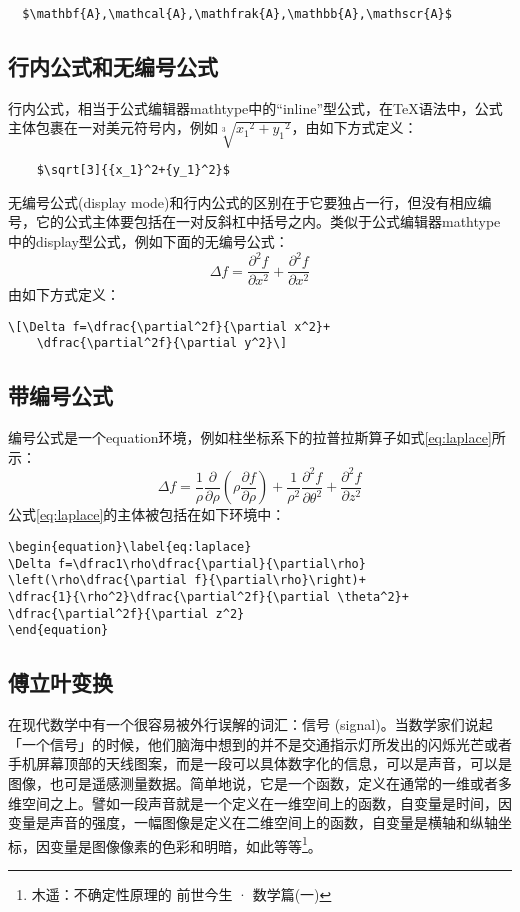 \begin{lstlisting}
  $\mathbf{A},\mathcal{A},\mathfrak{A},\mathbb{A},\mathscr{A}$
\end{lstlisting}

\subsection{行内公式和无编号公式}
行内公式，相当于公式编辑器mathtype中的“inline”型公式，在\TeX{}语法中，公式主体包裹在一对美元符号内，例如$\sqrt[3]{{x_1}^2+{y_1}^2}$，由如下方式定义：
\begin{lstlisting}
	$\sqrt[3]{{x_1}^2+{y_1}^2}$
\end{lstlisting}
无编号公式(display mode)和行内公式的区别在于它要独占一行，但没有相应编号，它的公式主体要包括在一对反斜杠中括号之内。类似于公式编辑器mathtype中的display型公式，例如下面的无编号公式：\[\Delta f=\dfrac{\partial^2f}{\partial x^2}+\dfrac{\partial^2f}{\partial x^2}\]由如下方式定义：
\begin{lstlisting}
\[\Delta f=\dfrac{\partial^2f}{\partial x^2}+
	\dfrac{\partial^2f}{\partial y^2}\]
\end{lstlisting}
\subsection{带编号公式}
编号公式是一个equation环境，例如柱坐标系下的拉普拉斯算子如式\ref{eq:laplace}所示：
\begin{equation}\label{eq:laplace}
	\Delta f=\dfrac1\rho\dfrac{\partial}{\partial \rho}\left(\rho\dfrac{\partial f}{\partial\rho}\right)+
	\dfrac{1}{\rho^2}\dfrac{\partial^2f}{\partial \theta^2}+
	\dfrac{\partial^2f}{\partial z^2}
\end{equation}
公式\ref{eq:laplace}的主体被包括在如下环境中：
\begin{lstlisting}
\begin{equation}\label{eq:laplace}
\Delta f=\dfrac1\rho\dfrac{\partial}{\partial\rho}
\left(\rho\dfrac{\partial f}{\partial\rho}\right)+
\dfrac{1}{\rho^2}\dfrac{\partial^2f}{\partial \theta^2}+
\dfrac{\partial^2f}{\partial z^2}
\end{equation}
\end{lstlisting}

\subsection{傅立叶变换}

在现代数学中有一个很容易被外行误解的词汇：信号 (signal)。当数学家们说起
「一个信号」的时候，他们脑海中想到的并不是交通指示灯所发出的闪烁光芒或者
手机屏幕顶部的天线图案，而是一段可以具体数字化的信息，可以是声音，可以是
图像，也可是遥感测量数据。简单地说，它是一个函数，定义在通常的一维或者多
维空间之上。譬如一段声音就是一个定义在一维空间上的函数，自变量是时间，因
变量是声音的强度，一幅图像是定义在二维空间上的函数，自变量是横轴和纵轴坐
标，因变量是图像像素的色彩和明暗，如此等等\footnote{木遥：不确定性原理的
  前世今生 · 数学篇(一)}。

